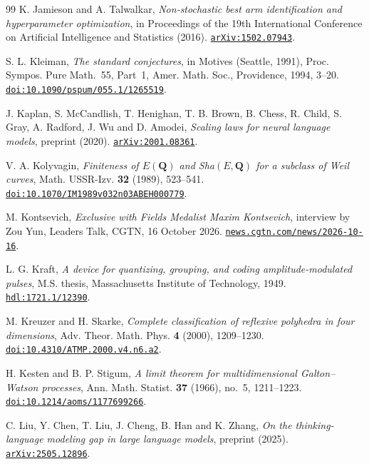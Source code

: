 \begin{thebibliography}{99}
K. Jamieson and A. Talwalkar,
\emph{Non-stochastic best arm identification and hyperparameter optimization},
in Proceedings of the 19th International Conference on Artificial Intelligence and Statistics (2016).
\href{https://arxiv.org/abs/1502.07943}{\nolinkurl{arXiv:1502.07943}}.

S. L. Kleiman,
\emph{The standard conjectures},
in Motives (Seattle, 1991), Proc. Sympos. Pure Math.~55, Part~1, Amer. Math. Soc., Providence, 1994, 3--20.
\href{https://doi.org/10.1090/pspum/055.1/1265519}{\nolinkurl{doi:10.1090/pspum/055.1/1265519}}.

J. Kaplan, S. McCandlish, T. Henighan, T. B. Brown, B. Chess, R. Child, S. Gray, A. Radford, J. Wu and D. Amodei,
\emph{Scaling laws for neural language models},
preprint (2020).
\href{https://arxiv.org/abs/2001.08361}{\nolinkurl{arXiv:2001.08361}}.

V. A. Kolyvagin,
\emph{Finiteness of $E(\mathbf{Q})$ and Sha$(E,\mathbf{Q})$ for a subclass of Weil curves},
Math. USSR-Izv. \textbf{32} (1989), 523--541.
\href{https://doi.org/10.1070/IM1989v032n03ABEH000779}{\nolinkurl{doi:10.1070/IM1989v032n03ABEH000779}}.

M. Kontsevich,
\emph{Exclusive with Fields Medalist Maxim Kontsevich},
interview by Zou Yun, Leaders Talk, CGTN, 16 October 2026.
\href{https://news.cgtn.com/news/2026-10-16/Exclusive-with-Fields-Medalist-Maxim-Kontsevich-1RhDvFy0KVW/p.html}{\nolinkurl{news.cgtn.com/news/2026-10-16}}.

L. G. Kraft,
\emph{A device for quantizing, grouping, and coding amplitude-modulated pulses},
M.S. thesis, Massachusetts Institute of Technology, 1949.
\href{https://hdl.handle.net/1721.1/12390}{\nolinkurl{hdl:1721.1/12390}}.

M. Kreuzer and H. Skarke,
\emph{Complete classification of reflexive polyhedra in four dimensions},
Adv. Theor. Math. Phys. \textbf{4} (2000), 1209--1230.
\href{https://doi.org/10.4310/ATMP.2000.v4.n6.a2}{\nolinkurl{doi:10.4310/ATMP.2000.v4.n6.a2}}.

H. Kesten and B. P. Stigum,
\emph{A limit theorem for multidimensional Galton--Watson processes},
Ann. Math. Statist. \textbf{37} (1966), no.~5, 1211--1223.
\href{https://doi.org/10.1214/aoms/1177699266}{\nolinkurl{doi:10.1214/aoms/1177699266}}.

C. Liu, Y. Chen, T. Liu, J. Cheng, B. Han and K. Zhang,
\emph{On the thinking-language modeling gap in large language models},
preprint (2025).
\href{https://arxiv.org/abs/2505.12896}{\nolinkurl{arXiv:2505.12896}}.


\end{thebibliography}
